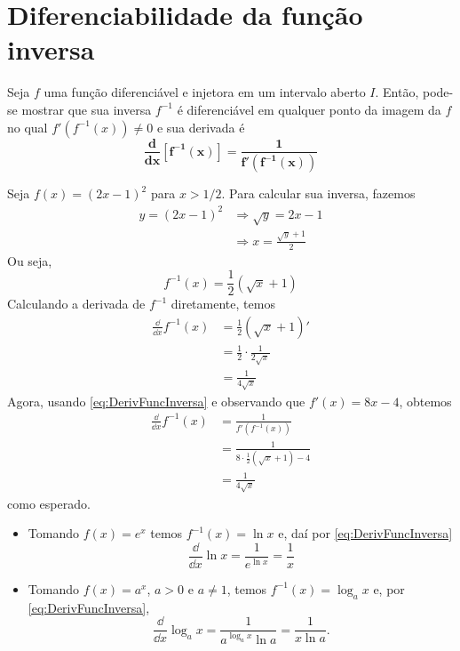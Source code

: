 \cleardoublepage\documentclass[../main.tex]{subfiles}
\begin{document}
\section{Diferenciabilidade da função inversa}\label{Chap:DerivFuncInversa}

Seja $f$ uma função diferenciável e injetora em um intervalo aberto $I$. Então, pode-se mostrar que sua inversa $f^{-1}$ é diferenciável em qualquer ponto da imagem da $f$ no qual $f'(f^{-1}(x))\neq 0$ e sua derivada é
\begin{equation}
  \boldsymbol{\frac{d}{dx}[f^{-1}(x)] = \frac{1}{f'(f^{-1}(x))}}\label{eq:DerivFuncInversa}
\end{equation}

\begin{ex}
  Seja $f(x) = (2x-1)^2$ para $x>1/2$. Para calcular sua inversa, fazemos
  \begin{align*}
    y = (2x-1)^2 &\Rightarrow \sqrt{y} = 2x-1\\
               &\Rightarrow x = \frac{\sqrt{y}+1}{2}
  \end{align*}
  Ou seja,
  \begin{equation*}
    f^{-1}(x) = \frac{1}{2}(\sqrt{x}+1)
  \end{equation*}
  Calculando a derivada de $f^{-1}$ diretamente, temos
  \begin{align*}
    \frac{\dd}{\dd x}f^{-1}(x) &= \frac{1}{2}\left(\sqrt{x}+1\right)' \\
                               &= \frac{1}{2}\cdot\frac{1}{2\sqrt{x}} \\
                               &= \frac{1}{4\sqrt{x}}
  \end{align*}
  Agora, usando \ref{eq:DerivFuncInversa} e observando que $f'(x) = 8x-4$, obtemos
  \begin{align*}
    \frac{\dd}{\dd x}f^{-1}(x) &= \frac{1}{f'(f^{-1}(x))}\\
                               &= \frac{1}{8\cdot \frac{1}{2}\left(\sqrt{x}+1\right)-4} \\
                               &= \frac{1}{4\sqrt{x}}
  \end{align*}
  como esperado.
\end{ex}

\begin{obs}
  \begin{itemize}
  \item Tomando $f(x) = e^x$ temos $f^{-1}(x) = \ln x$ e, daí por \ref{eq:DerivFuncInversa}
    \begin{equation}
      \frac{\dd }{\dd x}\ln x = \frac{1}{e^{\ln x}} = \frac{1}{x}
    \end{equation}
  \item Tomando $f(x) = a^x$, $a> 0$ e $a\neq 1$, temos $f^{-1}(x) = \log_a x$ e, por \ref{eq:DerivFuncInversa},
    \begin{equation}
      \frac{\dd}{\dd x}\log_a x = \frac{1}{a^{\log_a x}\ln a} = \frac{1}{x\ln a}.
    \end{equation}
  \end{itemize}
\end{obs}
\end{document}
